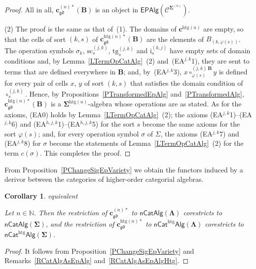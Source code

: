 \documentclass[a4paper, reqno]{amsbook}
\makeatletter
\newcommand{\sig}[1]{\mathbf{#1}}             %
\newcommand{\spec}[1]{\boldsymbol{\mathcal{#1}}} %
\newcommand{\gd}{\mathfrak{gd}}              %
\newcommand{\htg}{\mathrm{htg}}                %
\newcommand{\src}{\mathrm{sc}}
\newcommand{\tgt}{\mathrm{tg}}
\theoremstyle{plain}
\newtheorem{corollary}[theorem]{Corollary}
\theoremstyle{definition}
\newcommand*{\CA@leanpending}{}
\newcommand*{\CA@leanrelation}{}
\newcommand*{\lean}[2]{%
  \ifcsname\string\color@lean@#1\endcsname\else
    \PackageError{main}{Unknown relation `#1' in \string\lean}{Use equivalent, weaker or stronger.}%
  \fi
  \gdef\CA@leanrelation{#1}%
  \gdef\CA@leanpending{#2}}
\makeatother
\begin{document}
\begin{proof}
All in all, $\mathbf{c}^{(n)\ast}_{\gd}(\mathbf{B})$ is an object in $\mathsf{EPAlg}(\spec{C}^{\sig{\Sigma}^{(n)}})$.

(2) The proof is the same as that of~(1).
The domains of $\mathbf{c}^{\htg(n)}$ are empty, so that the cells of sort $(k,s)$ of $\mathbf{c}^{\htg(n)\ast}_{\gd}(\mathbf{B})$ are the elements of $B_{(k,\varphi(s))}$.
The operation symbols $\sigma_{k}$, $\src^{(j,k)}_{s}$, $\tgt^{(j,k)}_{s}$ and $\mathrm{i}^{(k,j)}_{s}$ have empty sets of domain conditions and, by Lemma~\ref{LTermOpCatAlg}~(2) and~(EA$^{j,k}$1), they are sent to terms that are defined everywhere in $\mathbf{B}$; and, by~(EA$^{j,k}$3), $x\circ^{(j,k)\,\mathbf{B}}_{\varphi(s)}y$ is defined for every pair of cells $x$, $y$ of sort $(k,s)$ that satisfies the domain condition of $\circ^{(j,k)}_{s}$.
Hence, by Propositions~\ref{PTransformedEpAlg} and~\ref{PTransformedAlg}, $\mathbf{c}^{\htg(n)\ast}_{\gd}(\mathbf{B})$ is a $\sig{\Sigma}^{\htg(n)}$-algebra whose operations are as stated.
As for the axioms, (EA0) holds by Lemma~\ref{LTermOpCatAlg}~(2); the axioms (EA$^{j,k}$1)--(EA$^{j,k}$6) and (EA$^{h,j,k}$1)--(EA$^{h,j,k}$5) for the sort $s$ become the same axioms for the sort $\varphi(s)$; and, for every operation symbol $\sigma$ of $\Sigma$, the axioms (EA$^{j,k}$7) and (EA$^{j,k}$8) for $\sigma$ become the statements of Lemma~\ref{LTermOpCatAlg}~(2) for the term $c(\sigma)$. This completes the proof.
\end{proof}

From Proposition~\ref{PChangeSigEpVariety} we obtain the functors induced by a derivor between the categories of higher-order categorial algebras.

\begin{corollary}\label{CChangeSigFunctor}\lean{equivalent}{ChangeOfSignature.homogeneousFunctor,ChangeOfSignature.heterogeneousFunctor}
Let $n\in\mathbb{N}$.
Then the restriction of $\mathbf{c}^{(n)\ast}_{\gd}$ to $\mathsf{nCatAlg}(\sig{\Lambda})$ corestricts to $\mathsf{nCatAlg}(\sig{\Sigma})$, and the restriction of $\mathbf{c}^{\htg(n)\ast}_{\gd}$ to $\mathsf{nCat}^{\htg}\mathsf{Alg}(\sig{\Lambda})$ corestricts to $\mathsf{nCat}^{\htg}\mathsf{Alg}(\sig{\Sigma})$.
\end{corollary}
\begin{proof}
It follows from Proposition~\ref{PChangeSigEpVariety} and Remarks~\ref{RCatAlgAsEpAlg} and~\ref{RCatAlgAsEpAlgHtg}.
\end{proof}
\end{document}
